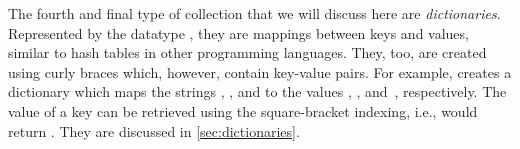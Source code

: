 The fourth and final type of collection that we will discuss here are \emph{dictionaries}.
Represented by the datatype , they are mappings between keys and values, similar to hash tables in other programming languages.
They, too, are created using curly braces which, however, contain key-value pairs.
For example,  creates a dictionary which maps the strings , , and  to the values , , and~, respectively.
The value of a key can be retrieved using the square-bracket indexing, i.e.,  would return .
They are discussed in \cref{sec:dictionaries}.%
%
%
%
%
%
%
%
%
%
\endhsection%
%
